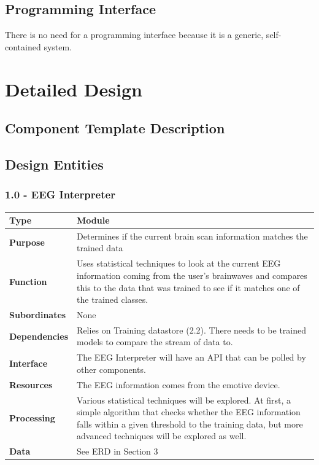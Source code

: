 \documentclass{article}
\begin{document}
\subsection{Programming Interface} 
There is no need for a programming interface because it is a generic, self-contained system.

\newpage

\section{Detailed Design}

\subsection{Component Template Description}

\subsection{Design Entities}

\subsubsection*{1.0 - EEG Interpreter}
\begin{tabular}{ | l |  p{13.3cm} |}
\hline
\textbf{Type} & Module \\ \hline
\textbf{Purpose} & Determines if the current brain scan information matches the trained data \\ \hline
\textbf{Function} & Uses statistical techniques to look at the current EEG information coming from the user's brainwaves and compares this to the data that was trained to see if it matches one of the trained classes. \\ \hline
\textbf{Subordinates} & None \\ \hline
\textbf{Dependencies} & Relies on Training datastore (2.2). There needs to be trained models to compare the stream of data to. \\ \hline
\textbf{Interface} & The EEG Interpreter will have an API that can be polled by other components. \\ \hline
\textbf{Resources} & The EEG information comes from the emotive device. \\ \hline
\textbf{Processing} & Various statistical techniques will be explored. At first, a simple algorithm that checks whether the EEG information falls within a given threshold to the training data, but more advanced techniques will be explored as well. \\ \hline
\textbf{Data} & See ERD in Section 3 \\ \hline
\end{tabular}
\end{document}
